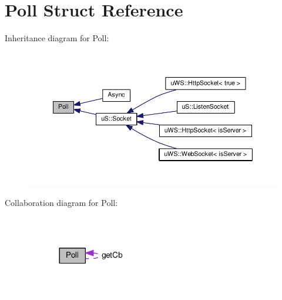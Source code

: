 \hypertarget{struct_poll}{}\section{Poll Struct Reference}
\label{struct_poll}


Inheritance diagram for Poll\+:
\nopagebreak
\begin{figure}[H]
\begin{center}
\leavevmode
\includegraphics[width=350pt]{struct_poll__inherit__graph}
\end{center}
\end{figure}


Collaboration diagram for Poll\+:
\nopagebreak
\begin{figure}[H]
\begin{center}
\leavevmode
\includegraphics[width=161pt]{struct_poll__coll__graph}
\end{center}
\end{figure}
